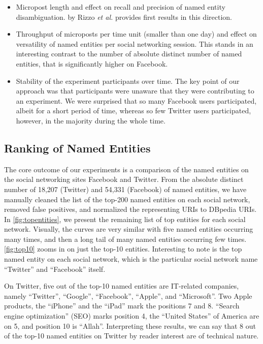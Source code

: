 \documentclass{iosart2c}
\begin{document}
\begin{itemize}
\item Micropost length and effect on recall and precision of named entity disambiguation.
\cite{nerd} by Rizzo \textit{et al.} provides first results in this direction.
\item Throughput of microposts per time unit (smaller than one day) and effect on versatility of named entities per social networking session.
This stands in an interesting contrast to the number of absolute distinct number of named entities, that is significantly higher on Facebook.
\item Stability of the experiment participants over time.
The key point of our approach was that participants were unaware that they were contributing to an experiment.
We were surprised that so many Facebook users participated, albeit for a short period of time, whereas so few Twitter users participated, however, in the majority during the whole time.
\end{itemize}

\subsection{Ranking of Named Entities}
The core outcome of our experiments is a comparison of the named entities on the social networking sites Facebook and Twitter.
From the absolute distinct number of 18,207 (Twitter) and 54,331 (Facebook) of named entities, we have manually cleaned the list of the top-200 named entities on each social network, removed false positives, and normalized the representing URIs to DBpedia URIs.
In \autoref{fig:topentities}, we present the remaining list of top entities for each social network.
Visually, the curves are very similar with five named entities occurring many times, and then a long tail of many named entities occurring few times.
\autoref{fig:top10} zooms in on just the top-10 entities.
Interesting to note is the top named entity on each social network, which is the particular social network name ``Twitter'' and ``Facebook'' itself. 

On Twitter, five out of the top-10 named entities are IT-related companies, namely ``Twitter'', ``Google'', ``Facebook'', ``Apple'', and ``Microsoft''.
Two Apple products, the ``iPhone'' and the ``iPad'' mark the positions 7 and 8.
``Search engine optimization'' (SEO) marks position 4, the ``United States'' of America are on 5, and position 10 is ``Allah''.
Interpreting these results, we can say that 8 out of the top-10 named entities on Twitter by reader interest are of technical nature.
\end{document}
